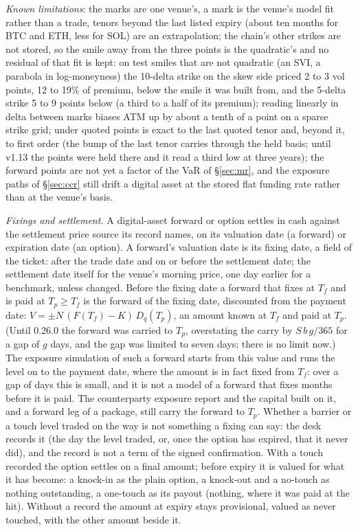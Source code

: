 \documentclass[11pt,a4paper]{article}
\newcommand{\code}[1]{\ifmmode\text{\small\texttt{\detokenize{#1}}}\else{\small\path{#1}}\fi}
\begin{document}
\emph{Known limitations}: the marks are one venue's, a mark is the venue's model fit rather than a trade, tenors beyond the last listed expiry (about ten months for BTC and ETH, less for SOL) are an extrapolation; the chain's other strikes are not stored, so the smile away from the three points is the quadratic's and no residual of that fit is kept: on test smiles that are not quadratic (an SVI, a parabola in log-moneyness) the 10-delta strike on the skew side priced 2 to 3 vol points, 12 to 19\% of premium, below the smile it was built from, and the 5-delta strike 5 to 9 points below (a third to a half of its premium); reading linearly in delta between marks biases ATM up by about a tenth of a point on a sparse strike grid; \code{CRYBASIS01} under quoted points is exact to the last quoted tenor and, beyond it, to first order (the bump of the last tenor carries through the held basis; until v1.13 the points were held there and it read a third low at three years); the forward points are not yet a factor of the VaR of \S\ref{sec:mr}, and the exposure paths of \S\ref{sec:ccr} still drift a digital asset at the stored flat funding rate rather than at the venue's basis.

\emph{Fixings and settlement.} A digital-asset forward or option settles in cash against the settlement price source its record names, on its valuation date (a forward) or expiration date (an option). A forward's valuation date is its fixing date, a field of the ticket: after the trade date and on or before the settlement date; the settlement date itself for the venue's morning price, one day earlier for a benchmark, unless changed. Before the fixing date a forward that fixes at $T_f$ and is paid at $T_p \ge T_f$ is the forward of the fixing date, discounted from the payment date: $V = \pm N\,(F(T_f) - K)\,D_q(T_p)$, an amount known at $T_f$ and paid at $T_p$. (Until 0.26.0 the forward was carried to $T_p$, overstating the carry by $S\,b\,g/365$ for a gap of $g$ days, and the gap was limited to seven days; there is no limit now.) The exposure simulation of such a forward starts from this value and runs the level on to the payment date, where the amount is in fact fixed from $T_f$: over a gap of days this is small, and it is not a model of a forward that fixes months before it is paid. The counterparty exposure report and the capital built on it, and a forward leg of a package, still carry the forward to $T_p$. Whether a barrier or a touch level traded on the way is not something a fixing can say: the desk records it (the day the level traded, or, once the option has expired, that it never did), and the record is not a term of the signed confirmation. With a touch recorded the option settles on a final amount; before expiry it is valued for what it has become: a knock-in as the plain option, a knock-out and a no-touch as nothing outstanding, a one-touch as its payout (nothing, where it was paid at the hit). Without a record the amount at expiry stays provisional, valued as never touched, with the other amount beside it.
\end{document}
